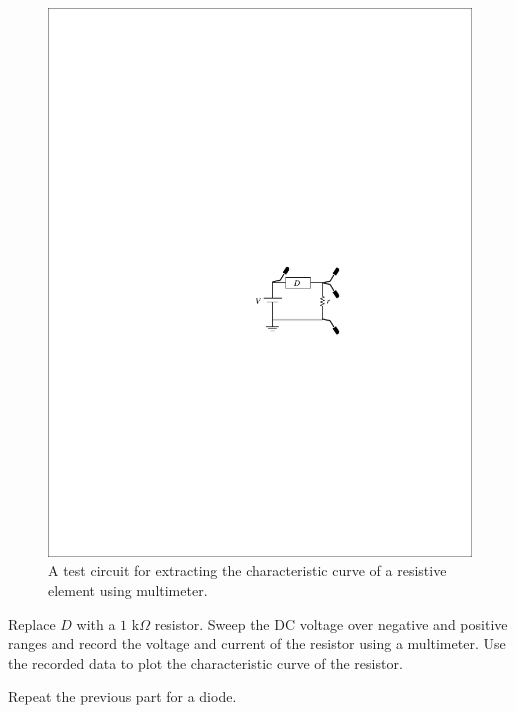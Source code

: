 \documentclass[11pt]{article}
\begin{document}

\begin{question}


\begin{figure}[H]
\centering
\includegraphics[scale=1.2,angle=0]{Fig/cir2.pdf}
\caption{A test circuit for extracting the characteristic curve of a resistive element using multimeter.} \label{fig:cir2}
\end{figure}

\begin{subquestion}{Replace $D$ with a $1$ k$\Omega$ resistor. Sweep the DC voltage over negative and positive ranges and record the voltage and current of the resistor using a multimeter. Use the recorded data to plot the characteristic curve of the resistor.} 
\answer{}
\end{subquestion}

\begin{subquestion}{Repeat the previous part for a diode.} 
\answer{}
\end{subquestion}


\end{question}
\end{document}
